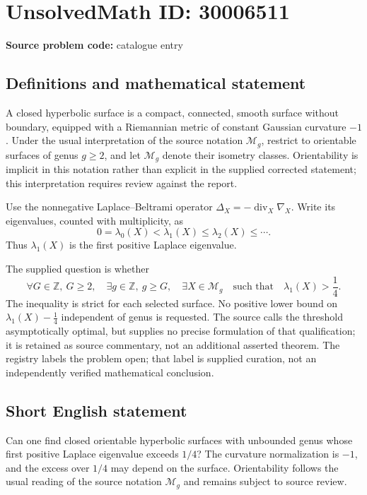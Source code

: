 \documentclass[11pt]{article}
\newcommand{\Z}{\mathbb{Z}}
\begin{document}
\section*{UnsolvedMath ID: 30006511}
\textbf{Source problem code:} catalogue entry
\subsection{Definitions and mathematical statement}
A closed hyperbolic surface is a compact, connected, smooth surface without boundary, equipped with a Riemannian metric of constant Gaussian curvature \(-1\). Under the usual interpretation of the source notation \(\mathcal M_g\), restrict to orientable surfaces of genus \(g\geq 2\), and let \(\mathcal M_g\) denote their isometry classes. Orientability is implicit in this notation rather than explicit in the supplied corrected statement; this interpretation requires review against the report.

Use the nonnegative Laplace--Beltrami operator \(\Delta_X=-\operatorname{div}_X\nabla_X\). Write its eigenvalues, counted with multiplicity, as
\[
0=\lambda_0(X)<\lambda_1(X)\leq\lambda_2(X)\leq\cdots.
\]
Thus \(\lambda_1(X)\) is the first positive Laplace eigenvalue.

The supplied question is whether
\[
\forall G\in\Z,\ G\geq 2,\quad
\exists g\in\Z,\ g\geq G,\quad
\exists X\in\mathcal M_g
\quad\text{such that}\quad
\lambda_1(X)>\frac14.
\]
The inequality is strict for each selected surface. No positive lower bound on \(\lambda_1(X)-\tfrac14\) independent of genus is requested. The source calls the threshold asymptotically optimal, but supplies no precise formulation of that qualification; it is retained as source commentary, not an additional asserted theorem. The registry labels the problem open; that label is supplied curation, not an independently verified mathematical conclusion.
\subsection{Short English statement}
Can one find closed orientable hyperbolic surfaces with unbounded genus whose first positive Laplace eigenvalue exceeds \(1/4\)? The curvature normalization is \(-1\), and the excess over \(1/4\) may depend on the surface. Orientability follows the usual reading of the source notation \(\mathcal M_g\) and remains subject to source review.
\end{document}
